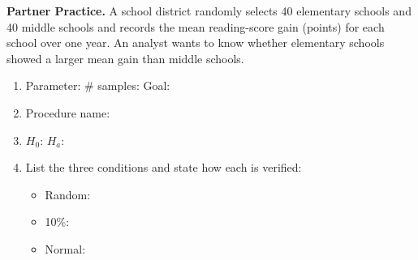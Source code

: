 \documentclass[10pt]{article}
\begin{document}
\begin{practicebox}
\textbf{Partner Practice.} \;
A school district randomly selects 40 elementary schools and 40 middle schools and records
the mean reading-score gain (points) for each school over one year. An analyst wants to know
whether elementary schools showed a larger mean gain than middle schools.

\begin{enumerate}
  \item Parameter:  \quad \# samples:  \quad Goal: 
  \item Procedure name: 
  \item $H_0$:  \quad $H_a$: 
  \item List the three conditions and state how each is verified:
        \begin{itemize}
          \item Random: 
          \item 10\%: 
          \item Normal: 
        \end{itemize}
\end{enumerate}
\end{practicebox}
\end{document}
